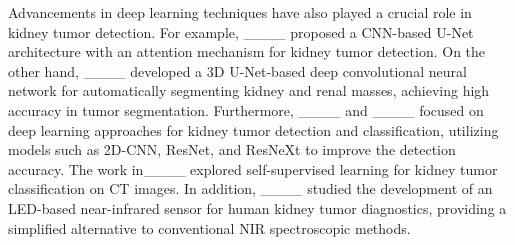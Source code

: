 Advancements in deep learning techniques have also played a crucial role in kidney tumor detection. For example, ____ proposed a CNN-based U-Net architecture with an attention mechanism for kidney tumor detection. On the other hand, ____ developed a 3D U-Net-based deep convolutional neural network for automatically segmenting kidney and renal masses, achieving high accuracy in tumor segmentation. Furthermore, ____ and ____ focused on deep learning approaches for kidney tumor detection and classification, utilizing models such as 2D-CNN, ResNet, and ResNeXt to improve the detection accuracy. The work in____ explored self-supervised learning for kidney tumor classification on CT images. In addition, ____ studied the development of an LED-based near-infrared sensor for human kidney tumor diagnostics, providing a simplified alternative to conventional NIR spectroscopic methods.


